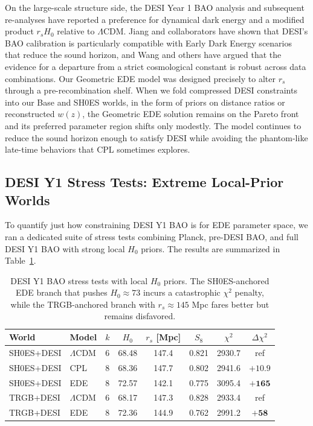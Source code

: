 \documentclass[a4paper,11pt]{article}
\begin{document}
On the large-scale structure side, the DESI Year 1 BAO analysis and subsequent re-analyses have reported a preference for dynamical dark energy and a modified product $r_s H_0$ relative to $\Lambda$CDM. Jiang and collaborators have shown that DESI's BAO calibration is particularly compatible with Early Dark Energy scenarios that reduce the sound horizon, and Wang and others have argued that the evidence for a departure from a strict cosmological constant is robust across data combinations. Our Geometric EDE model was designed precisely to alter $r_s$ through a pre-recombination shelf. When we fold compressed DESI constraints into our Base and SH0ES worlds, in the form of priors on distance ratios or reconstructed $w(z)$, the Geometric EDE solution remains on the Pareto front and its preferred parameter region shifts only modestly. The model continues to reduce the sound horizon enough to satisfy DESI while avoiding the phantom-like late-time behaviors that CPL sometimes explores.

\subsection*{DESI Y1 Stress Tests: Extreme Local-Prior Worlds}

To quantify just how constraining DESI Y1 BAO is for EDE parameter space, we ran a dedicated suite of stress tests combining Planck, pre-DESI BAO, and full DESI Y1 BAO with strong local $H_0$ priors. The results are summarized in Table~\ref{tab:desi_stress}.

\begin{table}[ht]
\centering
\caption{DESI Y1 BAO stress tests with local $H_0$ priors. The SH0ES-anchored EDE branch that pushes $H_0 \approx 73$ incurs a catastrophic $\chi^2$ penalty, while the TRGB-anchored branch with $r_s \approx 145$ Mpc fares better but remains disfavored.}
\label{tab:desi_stress}
\begin{tabular}{llcccccc}
\hline
World & Model & $k$ & $H_0$ & $r_s$ [Mpc] & $S_8$ & $\chi^2$ & $\Delta\chi^2$ \\
\hline
SH0ES+DESI & $\Lambda$CDM & 6 & 68.48 & 147.4 & 0.821 & 2930.7 & ref \\
SH0ES+DESI & CPL & 8 & 68.36 & 147.7 & 0.802 & 2941.6 & $+10.9$ \\
SH0ES+DESI & EDE & 8 & 72.57 & 142.1 & 0.775 & 3095.4 & $\mathbf{+165}$ \\
\hline
TRGB+DESI & $\Lambda$CDM & 6 & 68.17 & 147.3 & 0.828 & 2933.4 & ref \\
TRGB+DESI & EDE & 8 & 72.36 & 144.9 & 0.762 & 2991.2 & $\mathbf{+58}$ \\
\hline
\end{tabular}
\end{table}
\end{document}
